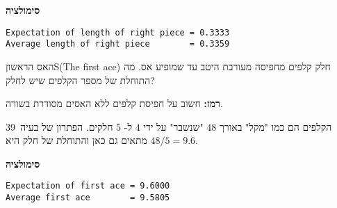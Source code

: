 \textbf{סימולציה}
\begin{verbatim}
Expectation of length of right piece = 0.3333
Average length of right piece        = 0.3359
\end{verbatim}


\begin{prob}{האס הראשון}{S}{(The first ace)}
חלק קלפים מחפיסה מעורבת היטב עד שמופיע אס. מה התוחלת של מספר הקלפים שיש לחלק?

\textbf{רמז:}
חשוב על חפיסת קלפים ללא האסים מסודרת בשורה.
\end{prob}

\solution{}
הקלפים הם כמו "מקל" באורך 
$48$
"שנשבר" על ידי 
$4$
ל-%
$5$
חלקים. הפתרון של בעיה~39 מתאים גם כאן והתוחלת של חלק היא
$48/5=9.6$.

\textbf{סימולציה}
\begin{verbatim}
Expectation of first ace = 9.6000
Average first ace        = 9.5805
\end{verbatim}


